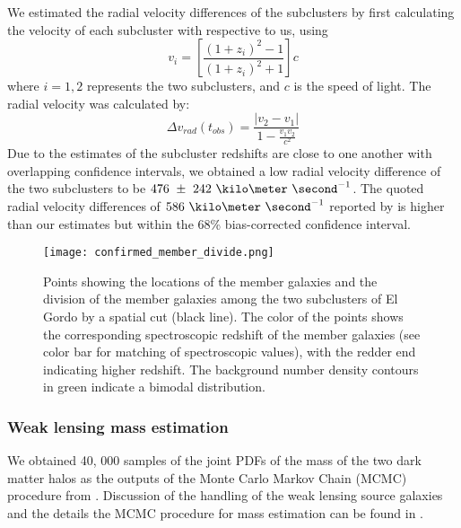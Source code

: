 We estimated the radial velocity differences of the
subclusters by first calculating the velocity of each subcluster with
respective to us, using  
\begin{equation}
	v_i = \left[ \frac{(1+z_i)^2 - 1 }{(1+z_i)^2 + 1 }\right]c
\end{equation}
where $i=1, 2$ represents the two subclusters, and $c$ is the speed of
light. The radial velocity was calculated by: 
\begin{equation}
	\Delta v_{rad}(t_{obs}) = \frac{|v_2 - v_1|}{1-\frac{v_1 v_2}{c^2}}
\end{equation}
Due to the estimates of the subcluster redshifts are close to
one another with overlapping confidence intervals, we obtained a low 
radial velocity difference of the two subclusters to be
$476~\pm~242~\kilo\meter~\second^{-1}$. 
The quoted radial velocity differences of $586~\kilo \meter~\second^{-1}$ reported by  
is higher than our estimates but within the 68\% bias-corrected
confidence interval. 

\begin{figure}
	\texttt{[image: confirmed\_member\_divide.png]}
	\caption{\label{fig:membership} Points showing the locations of the
	member galaxies and the division of the member galaxies among the two subclusters of El Gordo by a spatial cut
(black line). The color of the points shows the corresponding spectroscopic
redshift of the member galaxies (see color bar for matching of
spectroscopic values), with the redder end indicating higher
redshift. The background number density contours in green indicate a bimodal
distribution.} 
\end{figure}

\subsubsection{Weak lensing mass estimation} 
%
We obtained 40, 000 samples of the joint PDFs of the mass of the two dark
matter halos as the outputs of the Monte Carlo Markov Chain (MCMC)
procedure from \citealt{Jee13}. Discussion of the handling of the weak
lensing source galaxies and the details the MCMC procedure for mass
estimation can be found in \citealt{Jee13}.


